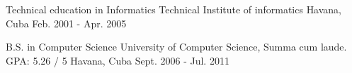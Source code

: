 


\begin{cventries}


\cventry
{Technical education in Informatics} %
{Technical Institute of informatics} %
{Havana, Cuba} %
{Feb. 2001 - Apr. 2005} %
{ %
}


\cventry
{B.S. in Computer Science} %
{University of Computer Science, Summa cum laude. GPA: 5.26 / 5} %
{Havana, Cuba} %
{Sept. 2006 - Jul. 2011} %
{ %
}


\end{cventries}
